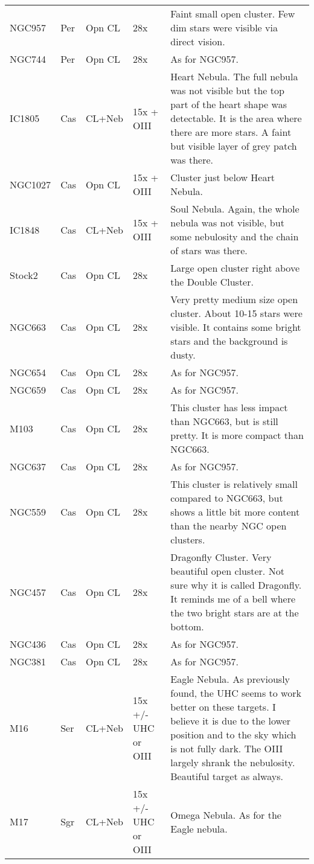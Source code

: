 \begin{longtable}{ p{0.7in}  p{0.3in}  p{0.6in}  p{0.9in}  p{5.8in} }
NGC957 & Per & Opn CL & 28x & Faint small open cluster. Few dim stars were visible via direct vision. \\ 
NGC744 & Per & Opn CL & 28x & As for NGC957. \\ 
IC1805 & Cas & CL+Neb & 15x + OIII & Heart Nebula. The full nebula was not visible but the top part of the heart shape was detectable. It is the area where there are more stars. A faint but visible layer of grey patch was there.  \\ 
NGC1027 & Cas & Opn CL & 15x + OIII & Cluster just below Heart Nebula. \\ 
IC1848 & Cas & CL+Neb & 15x + OIII & Soul Nebula. Again, the whole nebula was not visible, but some nebulosity and the chain of stars was there. \\ 
Stock2 & Cas & Opn CL & 28x & Large open cluster right above the Double Cluster.  \\ 
NGC663 & Cas & Opn CL & 28x & Very pretty medium size open cluster. About 10-15 stars were visible. It contains some bright stars and the background is dusty. \\ 
NGC654 & Cas & Opn CL & 28x & As for NGC957. \\ 
NGC659 & Cas & Opn CL & 28x & As for NGC957. \\ 
M103 & Cas & Opn CL & 28x & This cluster has less impact than NGC663, but is still pretty. It is more compact than NGC663. \\ 
NGC637 & Cas & Opn CL & 28x & As for NGC957. \\ 
NGC559 & Cas & Opn CL & 28x & This cluster is relatively small compared to NGC663, but shows a little bit more content than the nearby NGC open clusters. \\ 
NGC457 & Cas & Opn CL & 28x & Dragonfly Cluster. Very beautiful open cluster. Not sure why it is called Dragonfly. It reminds me of a bell where the two bright stars are at the bottom. \\ 
NGC436 & Cas & Opn CL & 28x & As for NGC957. \\ 
NGC381 & Cas & Opn CL & 28x & As for NGC957. \\ 
M16 & Ser & CL+Neb & 15x +/- UHC or OIII & Eagle Nebula. As previously found, the UHC seems to work better on these targets. I believe it is due to the lower position and to the sky which is not fully dark. The OIII largely shrank the nebulosity. Beautiful target as always. \\ 
M17 & Sgr & CL+Neb & 15x +/- UHC or OIII & Omega Nebula. As for the Eagle nebula. \\ 

\end{longtable}
